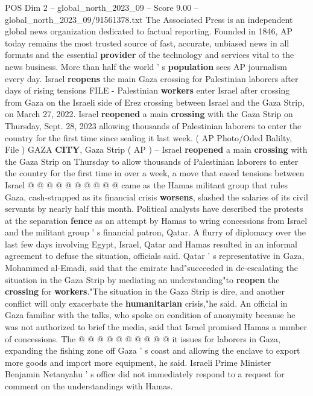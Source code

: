 \begin{textsample}{POS Dim 2 – global\_north\_2023\_09 – Score 9.00 – global\_north\_2023\_09/91561378.txt}  \label{ex:f2_pos_377}
The Associated Press is an independent global news organization dedicated to factual reporting.
Founded in 1846, AP today remains the most trusted source of fast, accurate, unbiased news in all formats and the essential \textbf{provider} of the technology and services vital to the news business.
More than half the world ' s \textbf{population} sees AP journalism every day.
Israel \textbf{reopens} the main Gaza crossing for Palestinian laborers after days of rising tensions FILE - Palestinian \textbf{workers} enter Israel after crossing from Gaza on the Israeli side of Erez crossing between Israel and the Gaza Strip, on March 27, 2022.
Israel \textbf{reopened} a main \textbf{crossing} with the Gaza Strip on Thursday, Sept. 28, 2023 allowing thousands of Palestinian laborers to enter the country for the first time since sealing it last week. ( AP Photo/Oded Balilty, File ) GAZA \textbf{CITY}, Gaza Strip ( AP ) -- Israel \textbf{reopened} a main \textbf{crossing} with the Gaza Strip on Thursday to allow thousands of Palestinian laborers to enter the country for the first time in over a week, a move that eased tensions between Israel @ @ @ @ @ @ @ @ @ @ came as the Hamas militant group that rules Gaza, cash-strapped as its financial crisis \textbf{worsens}, slashed the salaries of its civil servants by nearly half this month.
Political analysts have described the protests at the separation \textbf{fence} as an attempt by Hamas to wring concessions from Israel and the militant group ' s financial patron, Qatar.
A flurry of diplomacy over the last few days involving Egypt, Israel, Qatar and Hamas resulted in an informal agreement to defuse the situation, officials said.
Qatar ' s representative in Gaza, Mohammed al-Emadi, said that the emirate had"succeeded in de-escalating the situation in the Gaza Strip by mediating an understanding"to \textbf{reopen} the \textbf{crossing} for \textbf{workers}."The situation in the Gaza Strip is dire, and another conflict will only exacerbate the \textbf{humanitarian} crisis,"he said.
An official in Gaza familiar with the talks, who spoke on condition of anonymity because he was not authorized to brief the media, said that Israel promised Hamas a number of concessions.
The @ @ @ @ @ @ @ @ @ @ it issues for laborers in Gaza, expanding the fishing zone off Gaza ' s coast and allowing the enclave to export more goods and import more equipment, he said.
Israeli Prime Minister Benjamin Netanyahu ' s office did not immediately respond to a request for comment on the understandings with Hamas.

\end{textsample}
